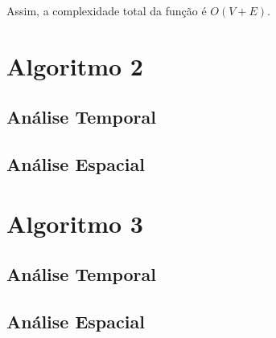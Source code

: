 Assim, a complexidade total da função é $O(V + E)$.

\pagebreak

\section{Algoritmo 2}
\label{sec:analise-formal:algoritmo-2}

\subsection{Análise Temporal}
\label{sec:analise-formal:algoritmo-2:analise-temporal}

\subsection{Análise Espacial}
\label{sec:analise-formal:algoritmo-2:analise-espacial}

\pagebreak

\section{Algoritmo 3}
\label{sec:analise-formal:algoritmo-3}

\subsection{Análise Temporal}
\label{sec:analise-formal:algoritmo-3:analise-temporal}

\subsection{Análise Espacial}
\label{sec:analise-formal:algoritmo-3:analise-espacial}